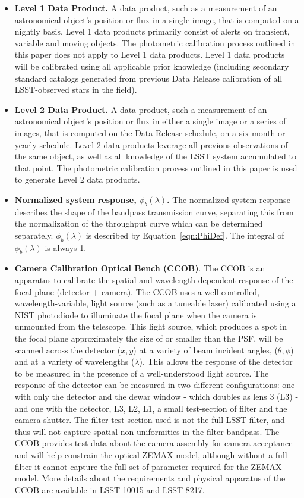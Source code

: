 \documentclass[12pt,preprint]{aastex}
\begin{document}
\begin{itemize}

\item{{\bf Level 1 Data Product.} A data product, such as a measurement
  of an astronomical object's position or flux in a single image, that
is computed on a nightly basis. Level 1 data products primarily
consist of alerts on transient, variable and moving objects. The
photometric calibration process outlined in this paper does not apply
to Level 1 data products. Level 1 data products will be calibrated
using all applicable prior knowledge (including secondary standard
catalogs generated from previous Data Release calibration of all
LSST-observed stars in the field). }

\item{{\bf Level 2 Data Product.} A data product, such a measurement
    of an astronomical object's position or flux in either a single
    image or a series of images, that is computed on the Data Release
    schedule, on a six-month or yearly schedule. Level 2 data products
    leverage all previous observations of the same object, as well as
    all knowledge of the LSST system accumulated to that point. The
    photometric calibration process outlined in this paper is used to
    generate Level 2 data products. }

\item{{\bf Normalized system response, $\phi_b(\lambda)$.} The
    normalized system response describes the shape of the bandpass
    transmission curve, separating this from the normalization of the
    throughput curve which can be determined separately.
    $\phi_b(\lambda)$ is described by Equation~\ref{eqn:PhiDef}. The
    integral of $\phi_b(\lambda)$ is always 1. }

\item{{\bf Camera Calibration Optical Bench (CCOB)}. The CCOB is an
apparatus to calibrate the spatial and wavelength-dependent response
of the focal plane (detector + camera). The CCOB uses a well
controlled, wavelength-variable, light source (such as a tuneable
laser) calibrated using a NIST photodiode to illuminate the focal
plane when the camera is unmounted from the telescope. This light
source, which produces a spot in the focal plane approximately the
size of or smaller than the PSF, will be scanned across the detector
($x,y$) at a variety of beam incident angles, ($\theta,\phi$) and at a
variety of wavelengths ($\lambda$).  This allows the response of the
detector to be measured in the presence of a well-understood light
source.  The response of the detector can be measured in two different
configurations: one with only the detector and the dewar window -
which doubles as lens 3 (L3) - and one with the detector, L3, L2, L1,
a small test-section of filter and the camera shutter.  The filter
test section used is not the full LSST filter, and thus will not
capture spatial non-uniformities in the filter bandpass.  The CCOB
provides test data about the camera assembly for camera acceptance and
will help constrain the optical ZEMAX model, although without a full
filter it cannot capture the full set of parameter required for the
ZEMAX model. More details about the requirements and physical apparatus of
the CCOB are available in LSST-10015 and LSST-8217.}


\end{itemize}
\end{document}
